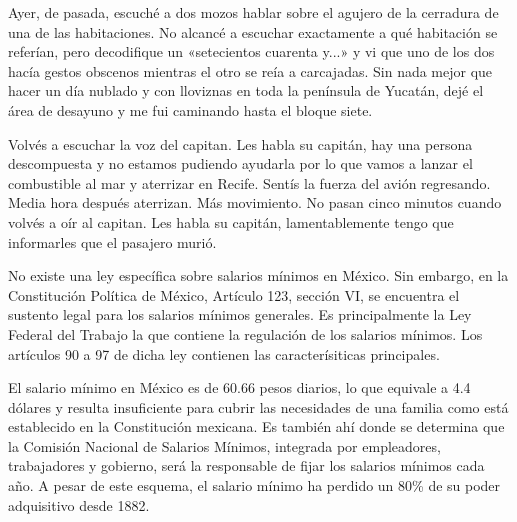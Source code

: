 \documentclass[12pt,twoside,openright,a5paper]{book}
\begin{document}
\vspace{0.5cm}
\hrulefill\hspace{0.2cm} \decofourleft\decofourright \hspace{0.2cm} \hrulefill
\vspace{0.5cm}

Ayer, de pasada, escuché a dos mozos hablar sobre el agujero de la cerradura de
una de las habitaciones. No alcancé a escuchar exactamente a qué habitación
se referían, pero decodifique un «setecientos cuarenta y...» y vi que uno
de los dos hacía gestos obscenos mientras el otro se reía a carcajadas. Sin
nada mejor que hacer un día nublado y con lloviznas en toda la península de
Yucatán, dejé el área de desayuno y me fui caminando hasta el bloque siete.


\vspace{0.5cm}
\hrulefill\hspace{0.2cm} \decofourleft\decofourright \hspace{0.2cm} \hrulefill
\vspace{0.5cm}

Volvés a escuchar la voz del capitan. Les habla su capitán, hay una
persona descompuesta y no estamos pudiendo ayudarla por lo que vamos a
lanzar el combustible al mar y aterrizar en Recife. Sentís la fuerza del
avión regresando. Media hora después aterrizan. Más movimiento. No pasan
cinco minutos cuando volvés a oír al capitan. Les habla su capitán,
lamentablemente tengo que informarles que el pasajero murió.


\vspace{0.5cm}
\hrulefill\hspace{0.2cm} \decofourleft\decofourright \hspace{0.2cm} \hrulefill
\vspace{0.5cm}

No existe una ley específica sobre salarios mínimos en México. Sin
embargo, en la Constitución Política de México, Artículo 123, sección
VI, se encuentra el sustento legal para los salarios mínimos generales. Es
principalmente  la Ley Federal del Trabajo la que contiene la regulación
de los salarios mínimos. Los artículos 90 a 97 de dicha ley contienen
las caracterísiticas principales.

El salario mínimo en México es de 60.66 pesos diarios, lo que equivale
a 4.4 dólares y resulta insuficiente para cubrir las necesidades de una
familia como está establecido en la Constitución mexicana. Es también
ahí donde se determina que la Comisión Nacional de Salarios Mínimos,
integrada por empleadores, trabajadores y gobierno, será la responsable de
fijar los salarios mínimos cada año. A pesar de este esquema, el salario
mínimo ha perdido un 80\% de su poder adquisitivo desde 1882.
\end{document}
